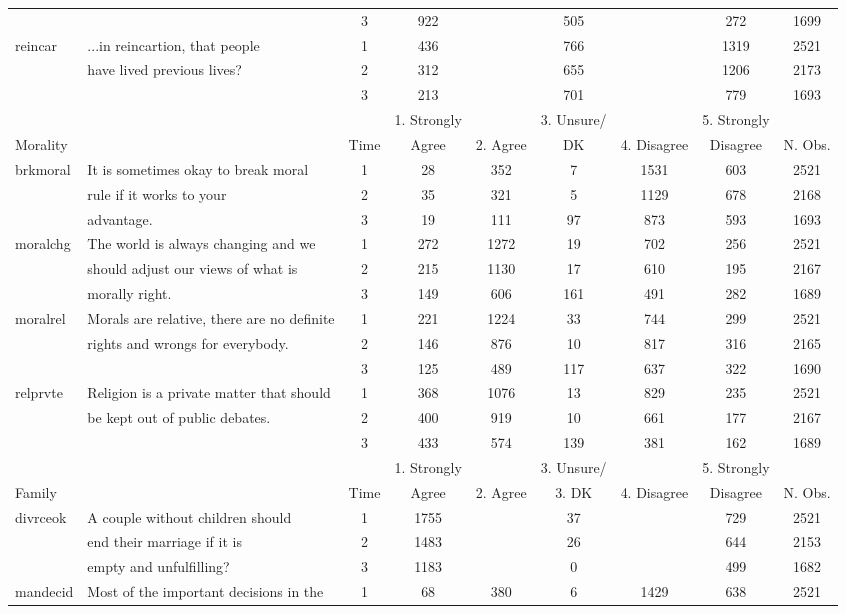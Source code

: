 \documentclass[12pt,]{article}
\begin{document}
\begin{table}
\begin{center}
\begin{tabular}{l l c c c c c c c}
 & & 3 & 922 &  & 505 &  & 272 & 1699\\
 reincar & ...in reincartion, that people  & 1 & 436 &  & 766 &  & 1319 & 2521\\
 & have lived previous lives? & 2 & 312 &  & 655 &  & 1206 & 2173\\
 &  & 3 & 213 &  & 701 &  & 779 & 1693\\
\hline
 &  &  & 1. Strongly &  & 3. Unsure/ &  & 5. Strongly & \\
Morality & & Time & Agree & 2. Agree & DK & 4. Disagree & Disagree & N. Obs.\\
\hline
 brkmoral & It is sometimes okay to break moral  & 1 & 28 & 352 & 7 & 1531 & 603 & 2521\\
 & rule if it works to your  & 2 & 35 & 321 & 5 & 1129 & 678 & 2168\\
 & advantage. & 3 & 19 & 111 & 97 & 873 & 593 & 1693\\
 moralchg  & The world is always changing and we   & 1 & 272 & 1272 & 19 & 702 & 256 & 2521\\
 & should adjust our views of what is  & 2 & 215 & 1130 & 17 & 610 & 195 & 2167\\
 & morally right. & 3 & 149 & 606 & 161 & 491 & 282 & 1689\\
 moralrel  & Morals are relative, there are no definite   & 1 & 221 & 1224 & 33 & 744 & 299 & 2521\\
 & rights and wrongs for everybody. & 2 & 146 & 876 & 10 & 817 & 316 & 2165\\
 & & 3 & 125 & 489 & 117 & 637 & 322 & 1690\\
 relprvte & Religion is a private matter that should   & 1 & 368 & 1076 & 13 & 829 & 235 & 2521\\
 & be kept out of public debates. & 2 & 400 & 919 & 10 & 661 & 177 & 2167\\
 &  & 3 & 433 & 574 & 139 & 381 & 162 & 1689\\
\hline
 &  &  & 1. Strongly &  & 3. Unsure/ &  & 5. Strongly & \\
Family &  & Time & Agree & 2. Agree & 3. DK & 4. Disagree & Disagree & N. Obs.\\
\hline
 divrceok  & A couple without children should    & 1 & 1755 &  & 37 &  & 729 & 2521\\
 & end their marriage if it is  & 2 & 1483 &  & 26 &  & 644 & 2153\\
 & empty and unfulfilling? & 3 & 1183 &  &  0 &  & 499 & 1682\\
 mandecid  & Most of the important decisions in the   & 1 & 68 & 380 & 6 & 1429 & 638 & 2521\\

\end{tabular}
\end{center}
\end{table}
\end{document}
